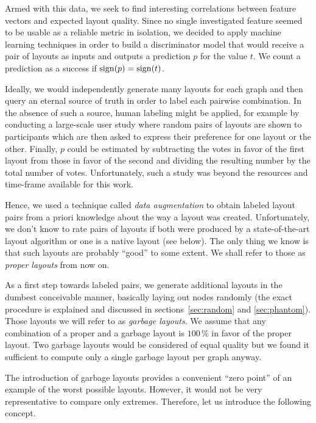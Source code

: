 \documentclass{graphstudy}
\begin{document}
Armed with this data, we seek to find interesting correlations between feature vectors and expected layout quality.
Since no single investigated feature seemed to be usable as a reliable metric in isolation, we decided to apply machine
learning techniques in order to build a discriminator model that would receive a pair of layouts as inputs and outputs a
prediction \(p\) for the value \(t\).  We count a prediction as a success if \(\operatorname{sign}(p)=\operatorname{sign}(t)\).

Ideally, we would independently generate many layouts for each graph and then query an eternal source of truth in order
to label each pairwise combination.  In the absence of such a source, human labeling might be applied, for example by
conducting a large-scale user study where random pairs of layouts are shown to participants which are then asked to
express their preference for one layout or the other.  Finally, \(p\) could be estimated by subtracting the votes in
favor of the first layout from those in favor of the second and dividing the resulting number by the total number of
votes.  Unfortunately, such a study was beyond the resources and time-frame available for this work.

Hence, we used a technique called \emph{data augmentation} to obtain labeled layout pairs from a priori knowledge about
the way a layout was created.  Unfortunately, we don't know to rate pairs of layouts if both were produced by a
state-of-the-art layout algorithm or one is a native layout (see below).  The only thing we know is that such layouts
are probably \enquote{good} to some extent.  We shall refer to those as \emph{proper layouts} from now on.

As a first step towards labeled pairs, we generate additional layouts in the dumbest conceivable manner, basically
laying out nodes randomly (the exact procedure is explained and discussed in \aclp*{section}~\ref{sec:random} and
\ref{sec:phantom}).  Those layouts we will refer to as \emph{garbage layouts}.  We assume that any combination of a
proper and a garbage layout is \(100\,\%\) in favor of the proper layout.  Two garbage layouts would be considered of
equal quality but we found it sufficient to compute only a single garbage layout per graph anyway.

The introduction of garbage layouts provides a convenient \enquote{zero point} of an example of the worst possible
layouts.  However, it would not be very representative to compare only extremes.  Therefore, let us introduce the
following concept.
\end{document}
